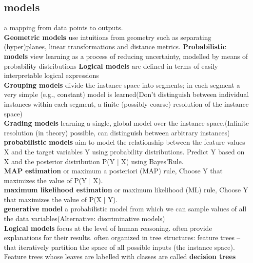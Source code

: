 \documentclass[cheatsheet.tex]{subfiles}
\begin{document}
\subsection{models}
a mapping from data points to outputs.
\\
\textbf{Geometric models} use intuitions from geometry such as separating
(hyper)planes, linear transformations and distance metrics. \textbf{Probabilistic models} view learning as a process of reducing uncertainty, modelled by means of probability distributions
\textbf{Logical models} are defined in terms of easily interpretable logical expressions
\\
\textbf{Grouping models} divide the instance space into segments; in each segment a very simple (e.g., constant) model is learned(Don't distinguish between individual instances within each segment, a finite (possibly coarse) resolution of the instance space)\\ 
\textbf{Grading models} learning a single, global model over the instance space.(Infinite resolution (in theory) possible, can distinguish between arbitrary instances)
\\
\textbf{probabilistic models} aim to model the relationship between the feature values X and the target variables Y using probability distributions. Predict Y based on X and the posterior distribution P(Y | X) using Bayes'Rule. 
\\
\textbf{MAP estimation} or maximum a posteriori (MAP) rule, Choose Y that maximizes the value of P(Y | X). 
\\
\textbf{maximum likelihood estimation} or maximum likelihood (ML) rule, Choose Y that maximizes the value of P(X | Y).
\\
\textbf{generative model} a probabilistic model from which we can sample values of all the data variables(Alternative: discriminative models) 
\\
\textbf{Logical models} focus at the level of human reasoning. often provide explanations for their results. often organized in tree structures: feature trees -- that iteratively partition the space of all possible inputs (the instance space). Feature trees whose leaves are labelled with classes are called \textbf{decision trees}
\end{document}
